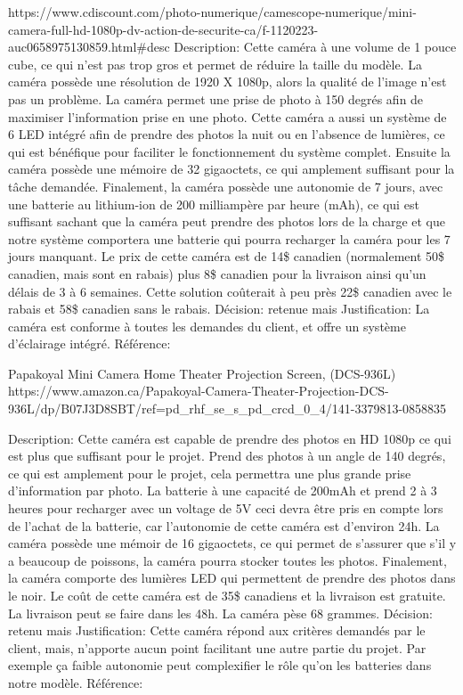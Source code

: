 	https://www.cdiscount.com/photo-numerique/camescope-numerique/mini-camera-full-hd-1080p-dv-action-de-securite-ca/f-1120223-auc0658975130859.html\#desc
	Description: Cette caméra à une volume de 1 pouce cube, ce qui n’est pas trop gros et permet de réduire la taille du modèle. La caméra possède une résolution de 1920 X 1080p, alors la qualité de l’image n’est pas un problème. La caméra permet une prise de photo à 150 degrés afin de maximiser l’information prise en une photo. Cette caméra a aussi un système de 6 LED intégré afin de prendre des photos la nuit ou en l'absence de lumières, ce qui est bénéfique pour faciliter le fonctionnement du système complet. Ensuite la caméra possède une mémoire de 32 gigaoctets, ce qui amplement suffisant pour la tâche demandée. Finalement, la caméra possède une autonomie de 7 jours, avec une batterie au lithium-ion de 200 milliampère par heure (mAh), ce qui est suffisant sachant que la caméra peut prendre des photos lors de la charge et que notre système comportera une batterie qui pourra recharger la caméra pour les 7 jours manquant. Le prix de cette caméra est de 14\$ canadien (normalement 50\$ canadien, mais sont en rabais) plus 8\$ canadien pour la livraison ainsi qu’un délais de 3 à 6 semaines. Cette solution coûterait à peu près 22\$ canadien avec le rabais et 58\$ canadien sans le rabais.
	Décision: retenue mais
	Justification: La caméra est conforme à toutes les demandes du client, et offre un système d’éclairage intégré.
	Référence:
	
	Papakoyal Mini Camera Home Theater Projection Screen, (DCS-936L)
	https://www.amazon.ca/Papakoyal-Camera-Theater-Projection-DCS-936L/dp/B07J3D8SBT/ref=pd\_rhf\_se\_s\_pd\_crcd\_0\_4/141-3379813-0858835
	
	Description:
	Cette caméra est capable de prendre des photos en HD 1080p ce qui est plus que suffisant pour le projet. Prend des photos à un angle de 140 degrés, ce qui est amplement pour le projet, cela permettra une plus grande prise d’information par photo. La batterie à une capacité de 200mAh et prend 2 à 3 heures pour recharger avec un voltage de 5V ceci devra être pris en compte lors de l’achat de la batterie, car l’autonomie de cette caméra est d’environ 24h. La caméra possède une mémoir de 16 gigaoctets, ce qui permet de s’assurer que s’il y a beaucoup de poissons, la caméra pourra stocker toutes les photos. Finalement, la caméra comporte des lumières LED qui permettent de prendre des photos dans le noir. Le coût de cette caméra est de 35\$ canadiens et la livraison est gratuite. La livraison peut se faire dans les 48h. La caméra pèse 68 grammes.
	Décision: retenu mais
	Justification: Cette caméra répond aux critères demandés par le client, mais, n’apporte aucun point facilitant une autre partie du projet. Par exemple ça faible autonomie peut complexifier le rôle qu’on les batteries dans notre modèle.
	Référence:
	
